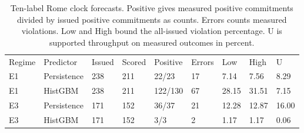 \begin{table}[!ht]
\centering\footnotesize\setlength{\tabcolsep}{2.4pt}
\caption{Ten-label Rome clock forecasts. Positive gives measured positive commitments divided by issued positive commitments as counts. Errors counts measured violations. Low and High bound the all-issued violation percentage. U is supported throughput on measured outcomes in percent.}
\begin{tabular}{lllllllll}
\hline
Regime & Predictor & Issued & Scored & Positive & Errors & Low & High & U \\
E1 & Persistence & 238 & 211 & 22/23 & 17 & 7.14 & 7.56 & 8.29 \\
E1 & HistGBM & 238 & 211 & 122/130 & 67 & 28.15 & 31.51 & 7.15 \\
E3 & Persistence & 171 & 152 & 36/37 & 21 & 12.28 & 12.87 & 16.00 \\
E3 & HistGBM & 171 & 152 & 3/3 & 2 & 1.17 & 1.17 & 0.06 \\
\hline
\end{tabular}
\end{table}
